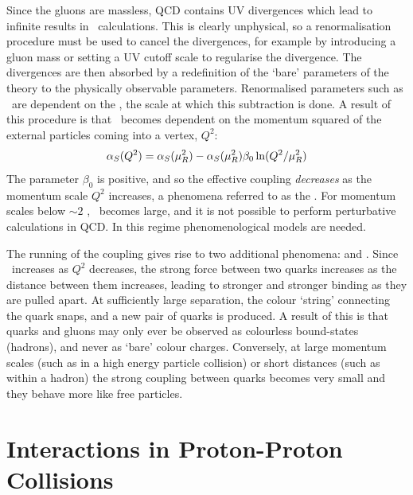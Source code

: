 Since the gluons are massless, QCD contains UV
divergences which lead to infinite results in \cx\ calculations. This 
is clearly unphysical, so a renormalisation procedure must be used to cancel the
divergences, for example by introducing a gluon mass or setting a UV cutoff
scale to regularise the divergence. The divergences are then absorbed by a
redefinition of the `bare' parameters of the theory to the physically observable
parameters. Renormalised parameters such as \alphaS\ are dependent on the   \uR, the
scale at which this subtraction is done. A result of this procedure is that
\alphaS\ becomes dependent on the momentum squared of the external particles
coming into a vertex, $Q^{2}$:
\begin{equation}
\alpha_{S}(Q^{2}) = \alpha_{S}(\mu_{R}^{2}) - \alpha_{S}(\mu_{R}^{2}) \beta_{0} \ln(Q^2{}/\mu_{R}^{2})
\end{equation}
The parameter $\beta_{0}$ is positive, and so the effective coupling
{\it decreases} as the momentum scale $Q^{2}$ increases, a phenomena referred to as
the . For momentum scales below
$\sim2$ \gev, \alphaS\ becomes large, and it is not possible to perform
perturbative calculations in QCD. In this  regime
phenomenological models are needed.

The running of the coupling gives rise to two additional phenomena:
 and . Since \alphaS\ increases as
$Q^{2}$ decreases, the strong force between two quarks increases as the distance
between them increases, leading to stronger and stronger binding as they are
pulled apart. At sufficiently large separation, the colour `string' connecting the
quark snaps, and a new pair of quarks is produced. A result of this is that
quarks and gluons may only ever be observed as colourless bound-states
(hadrons), and never as `bare' colour charges. Conversely, at large momentum
scales (such as in a high energy particle collision) or short distances (such as
within a hadron) the strong coupling between quarks becomes very small and they
behave more like free particles.

\section{Interactions in Proton-Proton Collisions}
\label{sec:Theory-ppInteractions}

